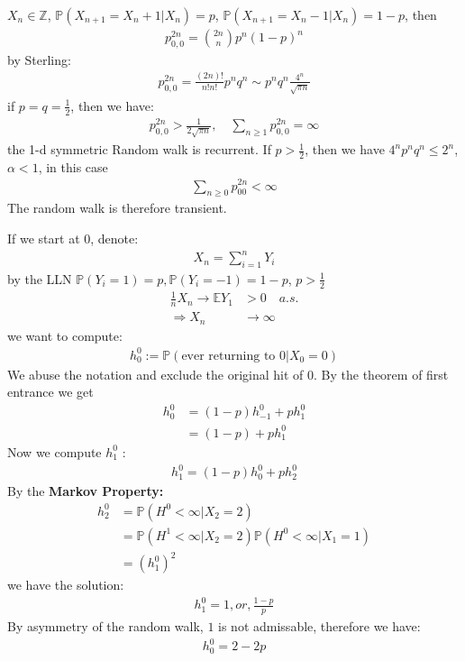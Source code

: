 \begin{example}
	$X_n \in \mathbb{Z}$, $\mathbb{P}(X_{n+1} = X_n + 1|X_n) = p$,  $\mathbb{P}(X_{n+1} = X_n - 1|X_n) = 1-p$, then
	\begin{align*}
		p_{0, 0}^{2n} = \binom{2n}{n} p^n(1-p)^n
	\end{align*}
	by Sterling:
	\begin{align*}
		p_{0, 0}^{2n} = \frac{(2n)!}{n!n!}p^n q^n \sim p^n q^n\frac{4^n}{\sqrt{\pi n}} 
	\end{align*}
	if $p = q = \frac{1}{2}$, then we have:
	\begin{align*}
		 p_{0, 0}^{2n} > \frac{1}{2 \sqrt{\pi n}}, \quad  \sum_{n \geq 1} p_{0, 0}^{2n} = \infty
	\end{align*}
	the 1-d symmetric Random walk is recurrent.
	If $p > \frac{1}{2}$, then we have $4^n p^n q^n \le 2^n$, $\alpha < 1$, in this case
	\begin{align*}
		\sum_{n \geq 0} p_{00}^{2n} < \infty
	\end{align*}
	The random walk is therefore transient.

	If we start at $0$, denote: 
	\begin{align*}
		X_n = \sum_{i = 1}^n Y_i 
	\end{align*}
	by the LLN
	$\mathbb{P}(Y_i = 1) = p, \mathbb{P}(Y_i = -1) = 1-p$, $p > \frac{1}{2}$
	\begin{align*}
		\frac{1}{n} X_n \rightarrow \mathbb{E}Y_1 &>0 \quad a.s.\\
		\Rightarrow  X_n &\rightarrow \infty
	\end{align*}
	we want to compute:
	\begin{align*}
		h^0_0:= \mathbb{P}(\text{ever returning to 0}|X_0 = 0)
	\end{align*}
	We abuse the notation and exclude the original hit of $0$. By the theorem of first entrance we get
	\begin{align*}
		h_0^0 &= (1 - p)h_{-1}^0 + ph_1^0\\
		&= (1 - p) + p h_1^0
	\end{align*}
	Now we compute $h_1^0$ :
	\begin{align*}
		h^0_1 = (1-p)h_0^0 + ph_2^0
	\end{align*}
	By the \textbf{Markov Property:}
	\begin{align*}
		h_2^0 &= \mathbb{P}(H^0< \infty|X_2 = 2) \\
		&= \mathbb{P}(H^1< \infty|X_2 = 2)\mathbb{P}(H^0 < \infty|X_1 = 1)\\
		&= (h_1^0)^2
	\end{align*}
	we have the solution:
	\begin{align*}
		h_1^0 = 1, or, \frac{1-p}{p}
	\end{align*}
	By asymmetry of the random walk, $1$ is not admissable, therefore we have:
	\begin{align*}
		h_0^0 = 2 - 2p
	\end{align*}
\end{example}

